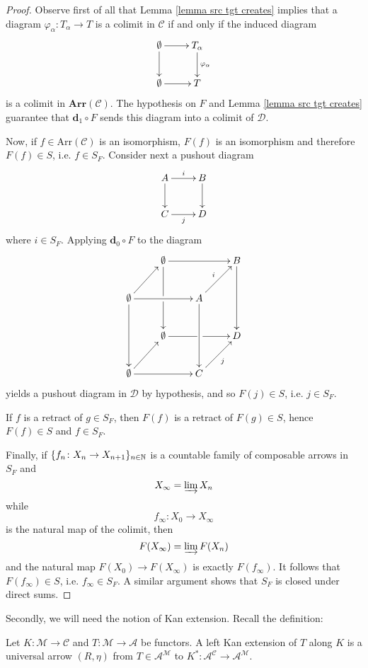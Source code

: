 \begin{proof}
Observe first of all that Lemma \ref{lemma src tgt creates} implies that a diagram $\varphi_\alpha \colon T_\alpha \to T$ is a colimit in $\mathcal C$ if and only if the induced diagram
\[
\xymatrix{
\emptyset \ar[r] \ar[d] & T_\alpha \ar[d]^{\varphi_\alpha} \\ \emptyset \ar[r] & T
}
\]
is a colimit in $\mathbf{Arr}(\mathcal C)$. The hypothesis on $F$ and Lemma \ref{lemma src tgt creates} guarantee that $\mathbf d_1 \circ F$ sends this diagram into a colimit of $\mathcal D$.

Now, if $f \in \mathrm{Arr}(\mathcal C)$ is an isomorphism, $F(f)$ is an isomorphism and therefore $F(f) \in S$, i.e. $f \in S_F$. Consider next a pushout diagram
\[
\xymatrix{
A \ar[r]^i \ar[d] & B \ar[d] \\ C \ar[r]_j & D
}
\]
where $i \in S_F$. Applying $\mathbf d_0 \circ F$ to the diagram
\[
\xymatrix{
& \emptyset \ar[rr] \ar[dd]|{\hole} & & B \ar[dd] \\ \emptyset \ar[ur] \ar[dd] \ar[rr] & & A \ar[ur]^i \ar[dd] \\ & \emptyset \ar[rr]|{\hole} & & D \\ \emptyset \ar[ur] \ar[rr] & & C \ar[ur]_j
}
\]
yields a pushout diagram in $\mathcal D$ by hypothesis, and so $F(j) \in S$, i.e. $j \in S_F$. 

If $f$ is a retract of $g \in S_F$, then $F(f)$ is a retract of $F(g) \in S$, hence $F(f) \in S$ and $f \in S_F$.

Finally, if $\{f_n \colon X_n \to X_{n+1}\}_{n \in \mathbb{N}}$ is a countable family of composable arrows in $S_F$ and
\[
X_\infty = \varinjlim X_n
\]
while
\[
f_\infty \colon X_0 \to X_\infty
\]
is the natural map of the colimit, then
\[
F(X_\infty) = \varinjlim F(X_n)
\]
and the natural map $F(X_0) \to F(X_\infty)$ is exactly $F(f_\infty)$. It follows that $F(f_\infty) \in S$, i.e. $f_\infty \in S_F$. A similar argument shows that $S_F$ is closed under direct sums.
\end{proof}

Secondly, we will need the notion of Kan extension. Recall the definition:

\begin{defin}
Let $K \colon \mathcal M \to \mathcal C$ and $T \colon \mathcal M \to \mathcal A$ be functors. A left Kan extension of $T$ along $K$ is a universal arrow $(R,\eta)$ from $T \in \mathcal A^{\mathcal M}$ to $K^* \colon \mathcal A^{\mathcal C} \to \mathcal A^{\mathcal M}$.
\end{defin}

